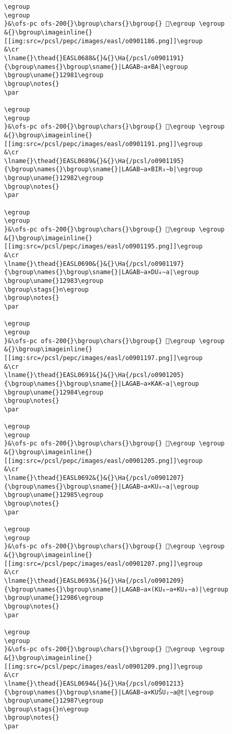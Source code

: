 \begin{verbatim}
\egroup
\egroup
}&\ofs-pc ofs-200{}\bgroup\chars{}\bgroup{} 𒦀\egroup \egroup
&{}\bgroup\imageinline{}[[img:src=/pcsl/pepc/images/easl/o0901186.png]]\egroup
&\cr
\lname{}\thead{}EASL0688&{}&{}\Ha{/pcsl/o0901191}{\bgroup\names{}\bgroup\sname{}|LAGAB∼a×BA|\egroup
\bgroup\uname{}12981\egroup
\bgroup\notes{}
\par 

\egroup
\egroup
}&\ofs-pc ofs-200{}\bgroup\chars{}\bgroup{} 𒦁\egroup \egroup
&{}\bgroup\imageinline{}[[img:src=/pcsl/pepc/images/easl/o0901191.png]]\egroup
&\cr
\lname{}\thead{}EASL0689&{}&{}\Ha{/pcsl/o0901195}{\bgroup\names{}\bgroup\sname{}|LAGAB∼a×BIR₃∼b|\egroup
\bgroup\uname{}12982\egroup
\bgroup\notes{}
\par 

\egroup
\egroup
}&\ofs-pc ofs-200{}\bgroup\chars{}\bgroup{} 𒦂\egroup \egroup
&{}\bgroup\imageinline{}[[img:src=/pcsl/pepc/images/easl/o0901195.png]]\egroup
&\cr
\lname{}\thead{}EASL0690&{}&{}\Ha{/pcsl/o0901197}{\bgroup\names{}\bgroup\sname{}|LAGAB∼a×DU₆∼a|\egroup
\bgroup\uname{}12983\egroup
\bgroup\stags{}n\egroup
\bgroup\notes{}
\par 

\egroup
\egroup
}&\ofs-pc ofs-200{}\bgroup\chars{}\bgroup{} 𒦃\egroup \egroup
&{}\bgroup\imageinline{}[[img:src=/pcsl/pepc/images/easl/o0901197.png]]\egroup
&\cr
\lname{}\thead{}EASL0691&{}&{}\Ha{/pcsl/o0901205}{\bgroup\names{}\bgroup\sname{}|LAGAB∼a×KAK∼a|\egroup
\bgroup\uname{}12984\egroup
\bgroup\notes{}
\par 

\egroup
\egroup
}&\ofs-pc ofs-200{}\bgroup\chars{}\bgroup{} 𒦄\egroup \egroup
&{}\bgroup\imageinline{}[[img:src=/pcsl/pepc/images/easl/o0901205.png]]\egroup
&\cr
\lname{}\thead{}EASL0692&{}&{}\Ha{/pcsl/o0901207}{\bgroup\names{}\bgroup\sname{}|LAGAB∼a×KU₆∼a|\egroup
\bgroup\uname{}12985\egroup
\bgroup\notes{}
\par 

\egroup
\egroup
}&\ofs-pc ofs-200{}\bgroup\chars{}\bgroup{} 𒦅\egroup \egroup
&{}\bgroup\imageinline{}[[img:src=/pcsl/pepc/images/easl/o0901207.png]]\egroup
&\cr
\lname{}\thead{}EASL0693&{}&{}\Ha{/pcsl/o0901209}{\bgroup\names{}\bgroup\sname{}|LAGAB∼a×(KU₆∼a+KU₆∼a)|\egroup
\bgroup\uname{}12986\egroup
\bgroup\notes{}
\par 

\egroup
\egroup
}&\ofs-pc ofs-200{}\bgroup\chars{}\bgroup{} 𒦆\egroup \egroup
&{}\bgroup\imageinline{}[[img:src=/pcsl/pepc/images/easl/o0901209.png]]\egroup
&\cr
\lname{}\thead{}EASL0694&{}&{}\Ha{/pcsl/o0901213}{\bgroup\names{}\bgroup\sname{}|LAGAB∼a×KUŠU₂∼a@t|\egroup
\bgroup\uname{}12987\egroup
\bgroup\stags{}n\egroup
\bgroup\notes{}
\par 


\end{verbatim}
